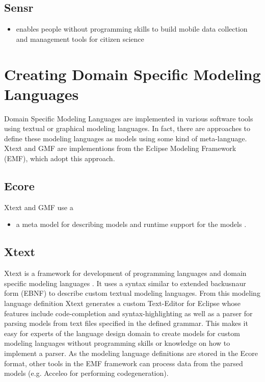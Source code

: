 \documentclass[runningheads,a4paper]{llncs}
\begin{document}
    \subsection{Sensr}
    \begin{itemize}
     \item enables people without programming skills to build mobile data collection and management tools for citizen science
    \end{itemize}

    
    \section{Creating Domain Specific Modeling Languages}
    Domain Specific Modeling Languages are implemented in various software tools using textual or graphical modeling languages.
    In fact, there are approaches to define these modeling languages as models using some kind of meta-language.
    Xtext and GMF are implementions from the Eclipse Modeling Framework (EMF), which adopt this approach.
    
    \subsection{Ecore}
    Xtext and GMF use a 
    \begin{itemize}
	\item  a meta model  for describing models and runtime support for the models .
    \end{itemize}
    
    \subsection{Xtext}
    Xtext is a framework for development of programming languages and domain specific modeling languages \cite{eysholdt2010xtext}.
    It uses a syntax similar to extended backus\–naur form (EBNF) to describe custom textual modeling languages. 
    From this modeling language definition Xtext generates a custom Text-Editor for Eclipse whose features include code-completion and syntax-highlighting
    as well as a parser for parsing models from text files specified in the defined grammar. This makes it easy for experts of the language design
    domain to create models for custom modeling languages without programming skills or knowledge on how to implement a parser.
    As the modeling language definitions are stored in the Ecore format, other tools in the EMF framework can process data from the parsed 
    models (e.g. Acceleo\cite{musset2006acceleo} for performing codegeneration).  
    
\end{document}
